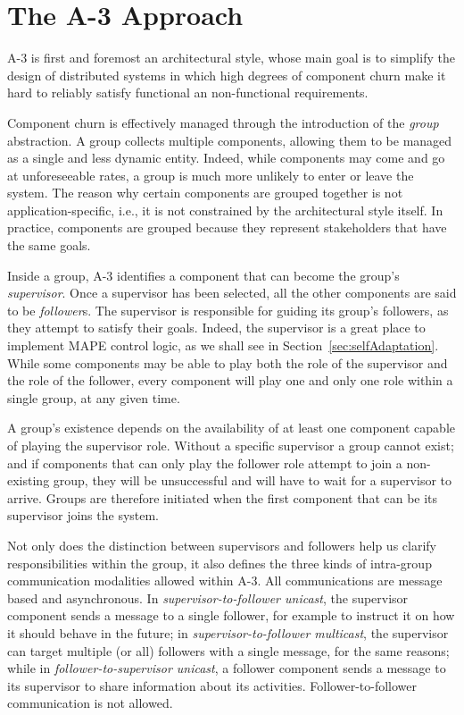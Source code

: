 
\section{The A-3 Approach}
\label{sec:approach}

A-3 is first and foremost an architectural style, whose main goal is to simplify the design of distributed systems in which high degrees of component churn make it hard to reliably satisfy functional an non-functional requirements.

Component churn is effectively managed through the introduction of the \emph{group} abstraction. A group collects multiple components, allowing them to be managed as a single and less dynamic entity. Indeed, while components may come and go at unforeseeable rates, a group is much more unlikely to enter or leave the system. The reason why certain components are grouped together is not application-specific, i.e., it is not constrained by the architectural style itself. In practice, components are grouped because they represent stakeholders that have the same goals. 

Inside a group, A-3 identifies a component that can become the group's \emph{supervisor}. Once a supervisor has been selected, all the other components are said to be \emph{follower}s. The supervisor is responsible for guiding its group's followers, as they attempt to satisfy their goals. Indeed, the supervisor is a great place to implement MAPE control logic, as we shall see in Section~\ref{sec:selfAdaptation}. While some components may be able to play both the role of the supervisor and the role of the follower, every component will play one and only one role within a single group, at any given time. 

A group's existence depends on the availability of at least one component capable of playing the supervisor role. Without a specific supervisor a group cannot exist; and if components that can only play the follower role attempt to join a non-existing group, they will be unsuccessful and will have to wait for a supervisor to arrive. Groups are therefore initiated when the first component that can be its supervisor joins the system. 

Not only does the distinction between supervisors and followers help us clarify responsibilities within the group, it also defines the three kinds of intra-group communication modalities allowed within A-3. All communications are message based and asynchronous. In \emph{supervisor-to-follower unicast}, the supervisor component sends a message to a single follower, for example to instruct it on how it should behave in the future; in \emph{supervisor-to-follower multicast}, the supervisor can target multiple (or all) followers with a single message, for the same reasons; while in \emph{follower-to-supervisor unicast}, a follower component sends a message to its supervisor to share information about its activities. Follower-to-follower communication is not allowed. 

